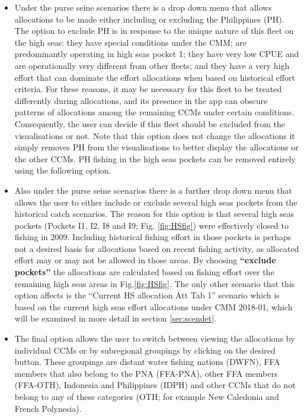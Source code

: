 \documentclass[11pt]{article}
\begin{document}
\begin{itemize}
\item Under the purse seine scenarios there is a drop down menu that allows allocations to be made either including or excluding the Philippines (PH). The option to exclude PH is in response to the unique nature of this fleet on the high seas: they have special conditions under the CMM; are predominantly operating in high seas pocket 1; they have very low CPUE and are operationally very different from other fleets; and they have a very high effort that can dominate the effort allocations when based on historical effort criteria. For these reasons, it may be necessary for this fleet to be treated differently during allocations, and its presence in the app can obscure patterns of allocations among the remaining CCMs under certain conditions. Consequently, the user can decide if this fleet should be excluded from the visualisations or not. Note that this option does not change the allocations it simply removes PH from the visualisations to better display the allocations or the other CCMs. PH fishing in the high seas pockets can be removed entirely using the following option.
\item Also under the purse seine scenarios there is a further drop down menu that allows the user to either include or exclude several high seas pockets from the historical catch scenarios. The reason for this option is that several high seas pockets (Pockets I1, I2, I8 and I9; Fig. \ref{fig:HSfig}) were effectively closed to fishing in 2009. Including historical fishing effort in those pockets is perhaps not a desired basis for allocations based on recent fishing activity, as allocated effort may or may not be allowed in those areas. By choosing {\bf ``exclude pockets''} the allocations are calculated based on fishing effort over the remaining high seas areas in Fig.\ref{fig:HSfig}. The only other scenario that this option affects is the ``Current HS allocation Att Tab 1'' scenario which is based on the current high seas effort allocations under CMM 2018-01, which will be examined in more detail in section \ref{sec:scendet}.
\item The final option allows the user to switch between viewing the allocations by individual CCMs or by subregional groupings by clicking on the desired button. These groupings are distant water fishing nations (DWFN), FFA members that also belong to the PNA (FFA-PNA), other FFA members (FFA-OTH), Indonesia and Philippines (IDPH) and other CCMs that do not belong to any of these categories (OTH; for example New Caledonia and French Polynesia).
\end{itemize}
\end{document}
